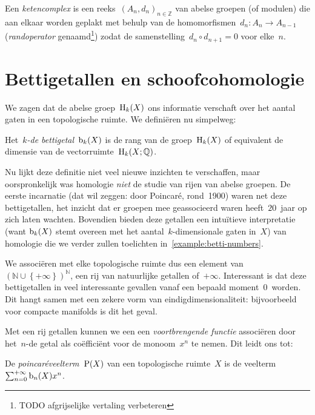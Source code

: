 \documentclass[a4paper,11pt,openany,oneside,article]{memoir}
\begin{document}
\begin{definition}
  Een \emph{ketencomplex} is een reeks~$(A_n,d_n)_{n\in\mathbb{Z}}$ van abelse groepen (of modulen) die aan elkaar worden geplakt met behulp van de homomorfismen~$d_n\colon A_n\to A_{n-1}$ (\emph{randoperator} genaamd\footnote{TODO afgrijselijke vertaling verbeteren}) zodat de samenstelling~$d_n\circ d_{n+1}=0$ voor elke~$n$.
\end{definition}



\section{Bettigetallen en schoofcohomologie}\label{section:betti-numbers}
We zagen dat de abelse groep~$\mathrm{H}_k(X)$ ons informatie verschaft over het aantal gaten in een topologische ruimte. We defini\"eren nu simpelweg:
\begin{definition}
  Het~\emph{$k$\nobreakdash-de bettigetal~$\mathrm{b}_k(X)$} is de rang van de groep~$\mathrm{H}_k(X)$ of equivalent de dimensie van de vectorruimte~$\mathrm{H}_k(X;\mathbb{Q})$.
\end{definition}

Nu lijkt deze definitie niet veel nieuwe inzichten te verschaffen, maar oorspronkelijk was homologie \emph{niet} de studie van rijen van abelse groepen. De eerste incarnatie (dat wil zeggen: door Poincar\'e, rond~1900) waren net deze bettigetallen, het inzicht dat er groepen mee geassocieerd waren heeft~$20$~jaar op zich laten wachten. Bovendien bieden deze getallen een intu\"itieve interpretatie (want $\mathrm{b}_k(X)$ stemt overeen met het aantal~$k$\nobreakdash-dimensionale gaten in~$X$) van homologie die we verder zullen toelichten in~\cref{example:betti-numbers}.

We associ\"eren met elke topologische ruimte dus een element van~$(\mathbb{N}\cup\left\{ +\infty \right\})^\mathbb{N}$, een rij van natuurlijke getallen of~$+\infty$. Interessant is dat deze bettigetallen in veel interessante gevallen vanaf een bepaald moment~$0$~worden. Dit hangt samen met een zekere vorm van eindigdimensionaliteit: bijvoorbeeld voor compacte manifolds is dit het geval.

Met een rij getallen kunnen we een een \emph{voortbrengende functie} associ\"eren door het~$n$\nobreakdash-de getal als co\"effici\"ent voor de monoom~$x^n$ te nemen. Dit leidt ons tot:

\begin{definition}
  De \emph{poincar\'eveelterm}~$\mathrm{P}(X)$ van een topologische ruimte~$X$ is de veelterm~$\sum_{n=0}^{+\infty}\mathrm{b}_n(X) x^n$.
\end{definition}
\end{document}
